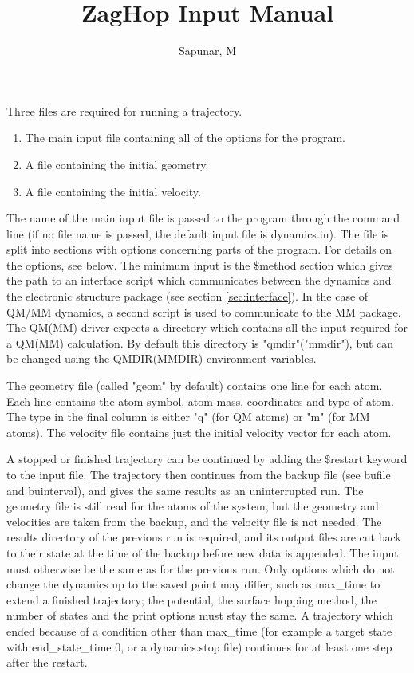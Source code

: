 \documentclass{report}
\title{ZagHop Input Manual}
\author{Sapunar, M}
\begin{document}
\maketitle

Three files are required for running a trajectory.
\begin{enumerate}
	\item The main input file containing all of the options for the program.
	\item A file containing the initial geometry.
	\item A file containing the initial velocity.
\end{enumerate}

The name of the main input file is passed to the program through the command line (if no file name is passed, the default input file is dynamics.in). The file is split into sections with options concerning parts of the program. For details on the options, see below. The minimum input is the \$method section which gives the path to an interface script which communicates between the dynamics and the electronic structure package (see section \ref{sec:interface}).
In the case of QM/MM dynamics, a second script is used to communicate to the MM package. The QM(MM) driver expects a directory which contains all the input required for a QM(MM) calculation. By default this directory is "qmdir"("mmdir"), but can be changed using the QMDIR(MMDIR) environment variables.

The geometry file (called "geom" by default) contains one line for each atom. Each line contains the atom symbol, atom mass, coordinates and type of atom. The type in the final column is either "q" (for QM atoms) or "m" (for MM atoms). The velocity file contains just the initial velocity vector for each atom.

A stopped or finished trajectory can be continued by adding the \$restart keyword to the input file. The trajectory then continues from the backup file (see bufile and buinterval), and gives the same results as an uninterrupted run. The geometry file is still read for the atoms of the system, but the geometry and velocities are taken from the backup, and the velocity file is not needed. The results directory of the previous run is required, and its output files are cut back to their state at the time of the backup before new data is appended. The input must otherwise be the same as for the previous run. Only options which do not change the dynamics up to the saved point may differ, such as max\_time to extend a finished trajectory; the potential, the surface hopping method, the number of states and the print options must stay the same. A trajectory which ended because of a condition other than max\_time (for example a target state with end\_state\_time 0, or a dynamics.stop file) continues for at least one step after the restart.
\end{document}
